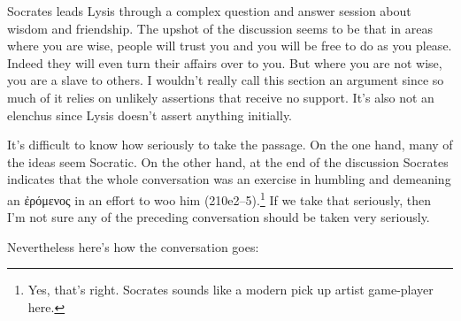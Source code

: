 \documentclass[11pt]{article}
\begin{document}
Socrates leads Lysis through a complex question and answer session about wisdom
and friendship.  The upshot of the discussion seems to be that in areas where
you are wise, people will trust you and you will be free to do as you please.
Indeed they will even turn their affairs over to you.  But where you are not
wise, you are a slave to others.  I wouldn't really call this section an
argument since so much of it relies on unlikely assertions that receive no
support.  It's also not an elenchus since Lysis doesn't assert anything
initially.

It's difficult to know how seriously to take the passage.  On the one hand,
many of the ideas seem Socratic.  On the other hand, at the end of the
discussion Socrates indicates that the whole conversation was an exercise in
humbling and demeaning an {\g ἐρόμενος} in an effort to woo him
(210e2--5).\footnote{Yes, that's right.  Socrates sounds like a modern pick up
artist game-player here.}  If we take that seriously, then I'm not sure any of
the preceding conversation should be taken very seriously.

Nevertheless here's how the conversation goes:
\end{document}
